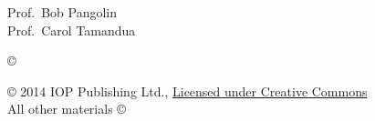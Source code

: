 %
%






\othercommitteemembers
{
 	Prof.~Bob Pangolin \\
 	Prof.~Carol Tamandua
}

\degreeyear{\the\year}

\copyrightdeclaration
{
	{\copyright} {\Degreeyear} \Authorname
}

 \prepublishedcopyrightdeclaration
 {
 	\hyperref[chap:2]{} {\copyright} 2014 IOP Publishing Ltd., \href{http://creativecommons.org/licenses/by/3.0}{Licensed under Creative Commons} \\
 	All other materials {\copyright} {\Degreeyear} \Authorname
 }

